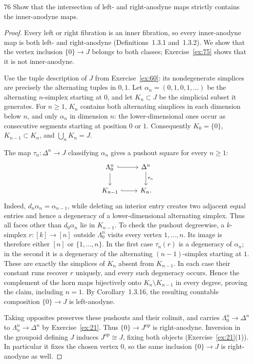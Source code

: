 \begin{exercise}{76}
Show that the intersection of left- and right-anodyne maps strictly contains the
inner-anodyne maps.

\begin{proof}
Every left or right fibration is an inner fibration, so every
inner-anodyne map is both left- and right-anodyne
(Definitions~1.3.1 and~1.3.2).
We show that the vertex inclusion $\{0\}\to J$ belongs to both
classes; Exercise~\ref{ex:75} shows that it is not inner-anodyne.

Use the tuple description of $J$ from Exercise~\ref{ex:60}:
its nondegenerate simplices are precisely the alternating
tuples in $0,1$.
Let $\alpha_n=(0,1,0,1,\ldots)$ be the alternating $n$-simplex
starting at $0$, and let $K_n\subset J$ be the simplicial subset
it generates.
For $n\geq1$, $K_n$ contains both alternating simplices in
each dimension below $n$, and only $\alpha_n$ in dimension $n$:
the lower-dimensional ones occur as consecutive segments
starting at position $0$ or $1$.
Consequently $K_0=\{0\}$, $K_{n-1}\subset K_n$, and
$\bigcup_nK_n=J$.

The map $\tau_n\colon\Delta^n\to J$ classifying $\alpha_n$
gives a pushout square for every $n\geq1$:
\[
\begin{tikzcd}
 \Lambda_0^n \arrow[r,hook] \arrow[d] & \Delta^n \arrow[d,"\tau_n"] \\
 K_{n-1} \arrow[r,hook] & K_n.
\end{tikzcd}
\]
Indeed, $d_n\alpha_n=\alpha_{n-1}$, while deleting an interior
entry creates two adjacent equal entries and hence a degeneracy
of a lower-dimensional alternating simplex.
Thus all faces other than $d_0\alpha_n$ lie in $K_{n-1}$.
To check the pushout degreewise, a $k$-simplex
$r\colon[k]\to[n]$ outside $\Lambda_0^n$ visits every vertex
$1,\ldots,n$.
Its image is therefore either $[n]$ or $\{1,\ldots,n\}$.
In the first case $\tau_n(r)$ is a degeneracy of $\alpha_n$;
in the second it is a degeneracy of the alternating
$(n-1)$-simplex starting at $1$.
These are exactly the simplices of $K_n$ absent from $K_{n-1}$.
In each case their constant runs recover $r$ uniquely, and
every such degeneracy occurs.
Hence the complement of the horn maps bijectively onto
$K_n\setminus K_{n-1}$ in every degree, proving the claim,
including $n=1$.
By Corollary~1.3.16, the resulting countable composition
$\{0\}\to J$ is left-anodyne.

Taking opposites preserves these pushouts and their colimit,
and carries $\Lambda_0^n\to\Delta^n$ to
$\Lambda_n^n\to\Delta^n$ by Exercise~\ref{ex:21}.
Thus $\{0\}\to J^{\mathrm{op}}$ is right-anodyne.
Inversion in the groupoid defining $J$ induces
$J^{\mathrm{op}}\cong J$, fixing both objects
(Exercise~\ref{ex:21}(1)).
In particular it fixes the chosen vertex $0$, so the same
inclusion $\{0\}\to J$ is right-anodyne as well.
\end{proof}
\end{exercise}
